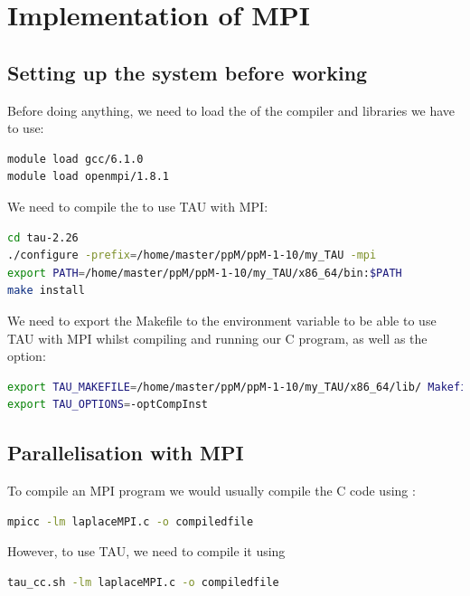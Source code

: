 \section{Implementation of MPI}

\subsection{Setting up the system before working}

Before doing anything, we need to load the  of the compiler and libraries we have to use:
\begin{lstlisting}[language=bash]
module load gcc/6.1.0
module load openmpi/1.8.1
\end{lstlisting}

We need to compile the  to use TAU with MPI:
\begin{lstlisting}[language=bash]
cd tau-2.26
./configure -prefix=/home/master/ppM/ppM-1-10/my_TAU -mpi
export PATH=/home/master/ppM/ppM-1-10/my_TAU/x86_64/bin:$PATH
make install
\end{lstlisting}

We need to export the Makefile to the environment variable to be able to use TAU with MPI whilst compiling and running our C program, as well as the  option:
\begin{lstlisting}[language=bash]
export TAU_MAKEFILE=/home/master/ppM/ppM-1-10/my_TAU/x86_64/lib/ Makefile.tau-mpi
export TAU_OPTIONS=-optCompInst
\end{lstlisting}

\subsection{Parallelisation with MPI}

To compile an MPI program we would usually compile the C code using :
\begin{lstlisting}[language=bash]
mpicc -lm laplaceMPI.c -o compiledfile
\end{lstlisting}

However, to use TAU, we need to compile it using
\begin{lstlisting}[language=bash]
tau_cc.sh -lm laplaceMPI.c -o compiledfile
\end{lstlisting}

